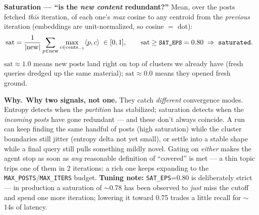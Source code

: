 \documentclass[11pt,a4paper]{article}
\newcommand{\why}[1]{%
  \par\vspace{2pt}%
  \noindent\colorbox{mist}{\begin{minipage}{\dimexpr\linewidth-2\fboxsep}%
  \textcolor{accent2}{\textbf{Why.}}~#1\end{minipage}}\par\vspace{3pt}}
\newcommand{\code}[1]{\texttt{\small #1}}
\begin{document}
\smallskip
\noindent\textbf{Saturation --- ``is the \emph{new content} redundant?''}
Mean, over the posts fetched \emph{this} iteration, of each one's \emph{max} cosine to any
centroid from the \emph{previous} iteration (embeddings are unit-normalized, so cosine $=$ dot):
\[
\text{sat}=\frac{1}{|\text{new}|}\sum_{p\in\text{new}}\max_{c\in\text{cents}_{-1}}\langle p, c\rangle
\;\in[0,1],\qquad \text{sat}\ge\text{\code{SAT\_EPS}}=0.80 \;\Rightarrow\;\texttt{saturated}.
\]
$\text{sat}\!\approx\!1.0$ means new posts land right on top of clusters we already have (fresh
queries dredged up the same material); $\text{sat}\!\approx\!0.0$ means they opened fresh ground.

\begin{center}
\end{center}

\why{\textbf{Why two signals, not one.} They catch \emph{different} convergence modes. Entropy
detects when the \emph{partition} has stabilized; saturation detects when the \emph{incoming
posts} have gone redundant --- and these don't always coincide. A run can keep finding the same
handful of posts (high saturation) while the cluster boundaries still jitter (entropy delta not
yet small), or settle into a stable shape while a final query still pulls something mildly novel.
Gating on \emph{either} makes the agent stop as soon as \emph{any} reasonable definition of
``covered'' is met --- a thin topic trips one of them in 2 iterations; a rich one keeps expanding
to the \code{MAX\_POSTS}/\code{MAX\_ITERS} budget. \textbf{Tuning note:} \code{SAT\_EPS}=0.80 is
deliberately strict --- in production a saturation of $\sim$0.78 has been observed to \emph{just}
miss the cutoff and spend one more iteration; lowering it toward 0.75 trades a little recall for
$\sim$14s of latency.}
\end{document}
